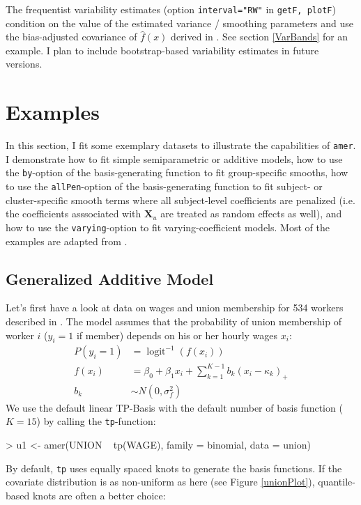 \documentclass[12pt]{article}
\newenvironment{Schunk}{}{}
\newcommand{\code}[1]{\texttt{\small{#1}}}
\begin{document}
The frequentist variability estimates (option \code{interval="RW"} in \code{getF,
plotF}) condition on the value of the estimated variance / smoothing parameters
and use the bias-adjusted covariance of $\hat f(x)$ derived in \citet[ch. 6.4,
eq. (6.13)]{Semip:Regr}. See section \ref{VarBands} for an example. I plan to
include bootstrap-based variability estimates in future versions.


\section{Examples}\label{Examples}
In this section, I fit some exemplary datasets to illustrate the capabilities
of \code{amer}. I demonstrate how to fit simple semiparametric or additive
models, how to use the \code{by}-option of the basis-generating function to fit
group-specific smooths, how to use the \code{allPen}-option of the
basis-generating function to fit subject- or cluster-specific smooth terms where
all subject-level coefficients are penalized (i.e. the coefficients asssociated
with $\bm X_u$ are treated as random effects as well), and how to use the
\code{varying}-option to fit varying-coefficient models. 
Most of the examples are adapted from \cite{Crainiceanu:2005}.

\subsection{Generalized Additive Model}\label{ExGAM}
Let's first have a look at data on wages and union membership for 534 workers
described in \citet{Berndt:1991}. The model assumes that the probability of union
membership of worker $i$ ($y_i=1$ if member) depends on his or her hourly wages
$x_i$:
\begin{align*}
P(y_i=1) &= \operatorname{logit}^{-1}(f(x_i))\\
f(x_i) &= \beta_0 + \beta_1 x_i + \sum_{k=1}^{K-1}  b_k(x_i- \kappa_k)_+\\
b_k &\sim N(0, \sigma^2_f) 
\end{align*}
We use the default linear TP-Basis with the default number of basis function
($K=15$) by calling the \code{tp}-function:
\begin{Schunk}
\begin{Sinput}
> u1 <- amer(UNION ~ tp(WAGE), family = binomial, data = union)
\end{Sinput}
\end{Schunk}
By default, \code{tp} uses equally spaced knots to generate the basis functions. If the covariate distribution is 
as non-uniform as here (see Figure \ref{unionPlot}), 
quantile-based knots are often a better choice:
\begin{Schunk}
\end{Schunk}
\end{document}
